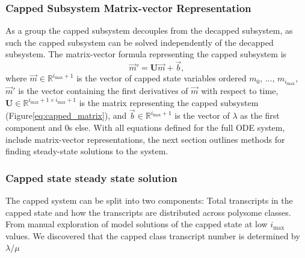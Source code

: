 \documentclass[a4,center,fleqn]{NAR}
\newcommand{\imax}{\ensuremath{{i_{\max}}}\xspace}
\let\bs\boldsymbol
\begin{document}
\subsubsection{Capped Subsystem Matrix-vector Representation}
As a group the capped subsystem decouples from the decapped subsystem, as such the capped subsystem can be solved independently of the decapped subsystem.  
The matrix-vector formula representing the capped subsystem is \begin{equation}
\vec{m}'=\bs{U}\vec{m}+\vec{b},\end{equation} where $\vec{m}\in\mathbb{R}^{\imax+1}$ is the vector of capped state variables ordered $m_0$, ..., $m_{\imax}$, $\vec{m}'$ is the vector containing the first derivatives of $\vec{m}$ with respect to time, $\bs{U}\in\mathbb{R}^{\imax+1\times \imax+1}$ is the matrix representing the capped subsystem (Figure\ref{eq:capped_matrix}), and $\vec{b}\in\mathbb{R}^{\imax+1}$ is the vector of $\lambda$ as the first component and 0s else.
With all equations defined for the full ODE system, include matrix-vector representations, the next section outlines methods for finding steady-state solutions to the system.


\subsubsection{Capped state steady state solution}

The capped system can be split into two components: Total transcripts in the capped state and how the transcripts are distributed across polysome classes. 
From manual exploration of model solutions of the capped state at low \imax values. 
We discovered that the capped class transcript number is determined by $\lambda/ \mu$
	
\end{document}
